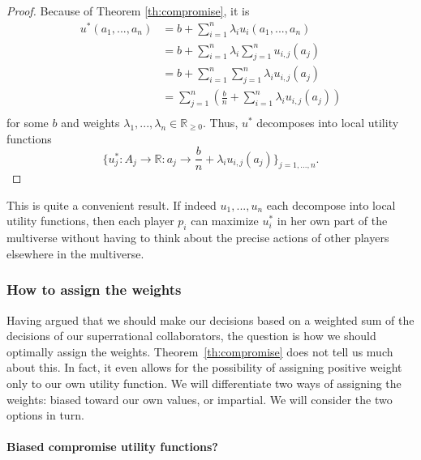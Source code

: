 \begin{proof}
Because of Theorem \ref{th:compromise}, it is 
\begin{equation*}
    \begin{split}
        u^{*}(a_{1},...,a_{n}) &= b + \sum_{i=1}^n\lambda_{i}u_{i}(a_{1},...,a_{n}) \\
                               &= b + \sum_{i=1}^n\lambda_{i}\sum_{j=1}^nu_{i,j}(a_{j}) \\
                               &= b + \sum_{i=1}^n\sum_{j=1}^n\lambda_{i}u_{i,j}(a_{j}) \\
                               &= \sum_{j=1}^n\left(\frac{b}{n} +
                               \sum_{i=1}^n\lambda_{i}u_{i,j}(a_{j})\right)\\
    \end{split}
\end{equation*}
for some \(b\) and weights \(\lambda_{1},...,\lambda_{n}
\in \mathbb{R}_{\geq 0}\). Thus, \(u^{*}\) decomposes into local utility functions
$$
\{ u_{j}^{*}:A_{j} \rightarrow \mathbb{R}{:a_{j} \rightarrow \frac{b}{n} +
\lambda_{i}u_{i,j}(a_{j})}\}_{j = 1,...,n}.
$$
\end{proof}
This is quite a convenient result. If indeed \(u_{1},...,u_{n}\) each
decompose into local utility functions, then each player \(p_{i}\) can
maximize \(u_{i}^{*}\) in her own part of the multiverse without having
to think about the precise actions of other players elsewhere in the
multiverse.

\hypertarget{how-to-assign-the-weights}{\subsubsection{How to assign the
weights}\label{how-to-assign-the-weights}}

Having argued that we should make our decisions based on a weighted sum
of the decisions of our superrational collaborators, the question is how
we should optimally assign the weights. Theorem~\ref{th:compromise} does not tell us much
about this. In fact, it even allows for the possibility of assigning
positive weight only to our own utility function. We will differentiate
two ways of assigning the weights: biased toward our own values, or
impartial. We will consider the two options in turn.

\paragraph{Biased compromise utility
functions?}\label{biased-compromise-utility-functions}

